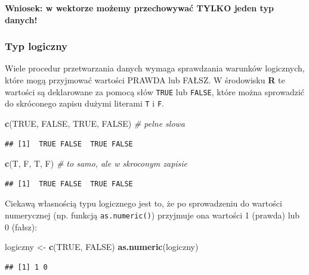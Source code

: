 \documentclass[]{book}
\newenvironment{Shaded}{\begin{snugshade}}{\end{snugshade}}
\newcommand{\KeywordTok}[1]{\textcolor[rgb]{0.13,0.29,0.53}{\textbf{#1}}}
\newcommand{\StringTok}[1]{\textcolor[rgb]{0.31,0.60,0.02}{#1}}
\newcommand{\CommentTok}[1]{\textcolor[rgb]{0.56,0.35,0.01}{\textit{#1}}}
\newcommand{\OtherTok}[1]{\textcolor[rgb]{0.56,0.35,0.01}{#1}}
\newcommand{\NormalTok}[1]{#1}
\theoremstyle{definition}
\theoremstyle{definition}
\theoremstyle{definition}
\theoremstyle{remark}
\begin{document}
\textbf{Wniosek: w wektorze możemy przechowywać TYLKO jeden typ danych!
}

\subsubsection{Typ logiczny}\label{typ-logiczny}

Wiele procedur przetwarzania danych wymaga sprawdzania warunków
logicznych, które mogą przyjmować wartości PRAWDA lub FAŁSZ. W
środowisku \textbf{R} te wartości są deklarowane za pomocą słów
\texttt{TRUE} lub \texttt{FALSE}, które można sprowadzić do skróconego
zapisu dużymi literami \texttt{T} i \texttt{F}.

\begin{Shaded}
\begin{Highlighting}[]
\KeywordTok{c}\NormalTok{(}\OtherTok{TRUE}\NormalTok{, }\OtherTok{FALSE}\NormalTok{, }\OtherTok{TRUE}\NormalTok{, }\OtherTok{FALSE}\NormalTok{) }\CommentTok{# pelne slowa}
\end{Highlighting}
\end{Shaded}

\begin{verbatim}
## [1]  TRUE FALSE  TRUE FALSE
\end{verbatim}

\begin{Shaded}
\begin{Highlighting}[]
\KeywordTok{c}\NormalTok{(T, F, T, F) }\CommentTok{# to samo, ale w skroconym zapisie}
\end{Highlighting}
\end{Shaded}

\begin{verbatim}
## [1]  TRUE FALSE  TRUE FALSE
\end{verbatim}

Ciekawą własnością typu logicznego jest to, że po sprowadzeniu do
wartości numerycznej (np. funkcją \texttt{as.numeric()}) przyjmuje ona
wartości 1 (prawda) lub 0 (fałsz):

\begin{Shaded}
\begin{Highlighting}[]
\NormalTok{logiczny <-}\StringTok{ }\KeywordTok{c}\NormalTok{(}\OtherTok{TRUE}\NormalTok{, }\OtherTok{FALSE}\NormalTok{) }
\KeywordTok{as.numeric}\NormalTok{(logiczny)}
\end{Highlighting}
\end{Shaded}

\begin{verbatim}
## [1] 1 0
\end{verbatim}
\end{document}
